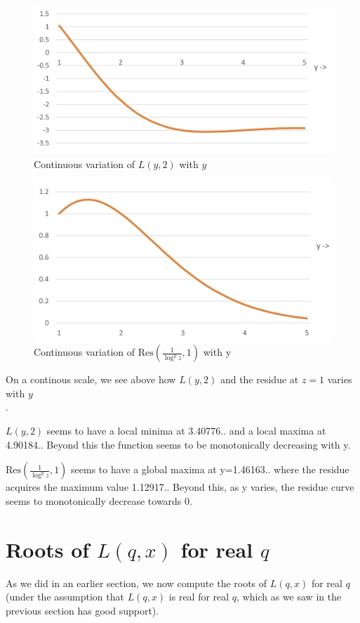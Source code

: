 \documentclass[a4paper,11pt,twoside]{amsart}
\newcommand\Res{\mathrm{Res}}
\begin{document}
\begin{figure}[H]
  \includegraphics[width=0.7\linewidth]{ly2_continuous.jpg}
  \caption{Continuous variation of $L(y,2)$ with $y$}
\end{figure}

\begin{figure}[H]
  \includegraphics[width=0.7\linewidth]{residue_curve.jpg}
  \caption{Continuous variation of $\Res\left(\frac{1}{\log^{y} z},1\right)$ with y}
\end{figure}

On a continous scale, we see above how $L(y,2)$ and the residue at $z=1$ varies with $y$\\. 

$L(y,2)$ seems to have a local minima at 3.40776.. and a local maxima at 4.90184.. Beyond this the function seems to be monotonically decreasing with y.

$\Res\left(\frac{1}{\log^{y} z},1\right)$ seems to have a global maxima at y=1.46163.. where the residue acquires the maximum value 1.12917.. Beyond this, as y varies, the residue curve seems to monotonically decrease towards 0.


\section{Roots of $L(q,x)$ for real $q$}

As we did in an earlier section, we now compute the roots of $L(q,x)$ for real $q$ (under the assumption that $L(q,x)$ is real for real $q$, which as we saw in the previous section has good support).
\end{document}
